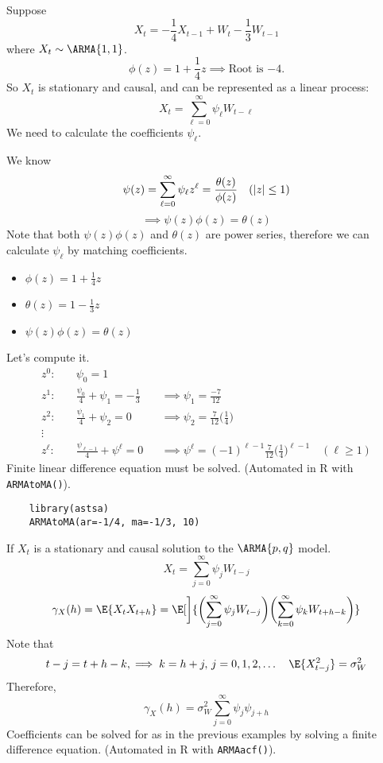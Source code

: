 \begin{Example}{}{}
    Suppose
    \[ X_t =-\frac{1}{4} X_{t-1}+W_t-\frac{1}{3}W_{t-1}\]
    where $X_t \sim \ARMA{1,1}$.
    \[\phi(z)=1+\frac{1}{4}z \implies \text{Root is $-4$.}\]
    So $X_t$ is stationary and causal, and can be represented as a linear process:
    \[X_t= \sum^{\infty}_{\ell=0} \psi_\ell W_{t-\ell} \]
    We need to calculate the coefficients $\psi_\ell$.

    We know
    \[\psi(z)= \sum^{\infty}_{\ell=0} \psi_\ell z^\ell = \frac{\theta(z)}{\phi(z)}\quad (\lvert z\rvert\leq 1)  \]
    \[\implies \psi(z)\phi(z)=\theta(z) \]
    Note that both $ \psi(z)\phi(z) $ and $ \theta(z) $ are power series, therefore
    we can calculate $ \psi_\ell $ by matching coefficients.
    \begin{itemize}
        \item $ \displaystyle \phi(z)=1+ \frac{1}{4}z $
        \item $ \displaystyle  \theta(z)= 1-\frac{1}{3}z $
        \item $ \psi(z)\phi(z)=\theta(z) $
    \end{itemize}
    Let's compute it.
    \begin{align*}
        z^0    :\quad & \psi_0=1                                                                                          \\
        z^1    :\quad & \frac{\psi_0}{4}+\psi_1=-\frac{1}{3}  &  & \implies \psi_1=\frac{-7}{12}                          \\
        z^2    :\quad & \frac{\psi_1}{4}+\psi_2 = 0           &  & \implies \psi_2=\frac{7}{12} \biggl(\frac{1}{4}\biggr) \\
        \vdots \quad  &                                                                                                   \\
        z^\ell :\quad & \frac{\psi_{\ell-1}}{4} + \psi^\ell=0 &  & \implies
        \psi^\ell= (-1)^{\ell-1}\frac{7}{12}\biggl(\frac{1}{4}\biggr)^{\ell-1}\quad(\ell\ge 1)
    \end{align*}
    Finite linear difference equation must be solved. (Automated in R with \texttt{ARMAtoMA()}).
    \begin{verbatim}
    library(astsa)
    ARMAtoMA(ar=-1/4, ma=-1/3, 10)
    \end{verbatim}
    If $X_t$ is a stationary and causal solution to the $\ARMA{p,q}$ model.
    \[X_t = \sum^{\infty}_{j=0} \psi_j W_{t-j}\]
    \[\gamma_X(h) =
        \E{X_t X_{t+h}}= \E[\bigg]{\biggl(\sum^{\infty}_{j=0}\psi_j W_{t-j}\biggr)\biggl(\sum^{\infty}_{k=0} \psi_k W_{t+h-k}\biggr)} \]
    Note that
    \[t-j= t+h-k, \implies k=h+j,\, j=0,1,2,\ldots\quad  \E{X^2_{t-j}}=\sigma_W^2\]
    Therefore,
    \[\gamma_X(h) =\sigma_W^2 \sum^{\infty}_{j=0} \psi_j \psi_{j+h} \]
    Coefficients can be solved for as in the previous examples by solving a finite difference equation.
    (Automated in R with \texttt{ARMAacf()}).
\end{Example}
